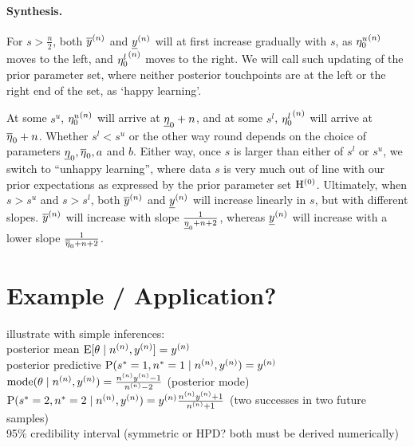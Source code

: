 

\paragraph{Synthesis.}

For $s > \frac{n}{2}$, both $\overline{y}^{(n)}$ and $\underline{y}^{(n)}$ will at first increase gradually with $s$,
as ${\eta_0^u}^{(n)}$ moves to the left, and ${\eta_0^l}^{(n)}$ moves to the right.
We will call such updating of the prior parameter set,
where neither posterior touchpoints are at the left or the right end of the set, as `happy learning'.

At some $s^u$, ${\eta_0^u}^{(n)}$ will arrive at $\underline{\eta}_0 + n$,
and at some $s^l$, ${\eta_0^l}^{(n)}$ will arrive at $\overline{\eta}_0 + n$.
Whether $s^l < s^u$ or the other way round depends on
the choice of parameters $\underline{\eta}_0, \overline{\eta}_0, a$ and $b$.
Either way, once $s$ is larger than either of $s^l$ or $s^u$,
we switch to ``unhappy learning'',
where data $s$ is very much out of line with our prior expectations as expressed
by the prior parameter set $\mathrm{H}^{(0)}$.
Ultimately, when $s > s^u$ and $s > s^l$,
both $\overline{y}^{(n)}$ and $\underline{y}^{(n)}$ will increase linearly in $s$, but with different slopes.
$\overline{y}^{(n)}$ will increase with slope $\frac{1}{\underline{\eta}_0 + n + 2}$,
whereas $\underline{y}^{(n)}$ will increase with a lower slope $\frac{1}{\overline{\eta}_0 + n + 2}$.


\section{Example / Application?}
\label{sec:examples}

illustrate with simple inferences:\\
posterior mean $\operatorname{E}[\theta\mid n^{(n)},y^{(n)}] = y^{(n)}$\\
posterior predictive $\operatorname{P}(s^*=1,n^*=1\mid n^{(n)}, y^{(n)}) = y^{(n)}$\\
$\operatorname{mode}(\theta\mid n^{(n)}, y^{(n)}) = \frac{n^{(n)}y^{(n)} -1}{n^{(n)} -2}$ (posterior mode)\\
$\operatorname{P}(s^*=2,n^*=2\mid n^{(n)}, y^{(n)}) = y^{(n)} \frac{n^{(n)}y^{(n)} + 1}{n^{(n)} + 1}$ (two successes in two future samples)\\
95\% credibility interval (symmetric or HPD? both must be derived numerically)

